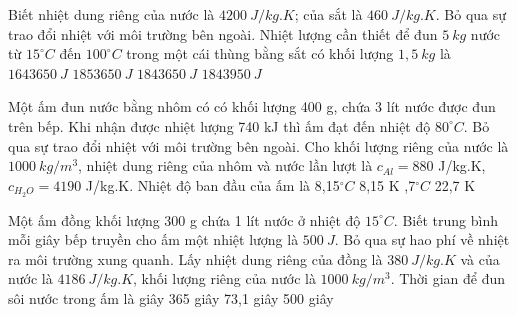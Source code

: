 \begin{vidu} 
	 Biết nhiệt dung riêng của nước là $4200 \ J / kg . K$; của sắt là $460 \ J / kg . K$. Bỏ qua sự trao đổi nhiệt với môi trường bên ngoài. Nhiệt lượng cần thiết để đun $5 \ kg$ nước từ $15^\circ C$ đến $100^\circ C$ trong một cái thùng bằng sắt có khối lượng $1,5 \ kg$ là
	\choice
	{$1643650 \ J$}
	{$1853650 \ J$}
	{\True $1843650 \ J$}
	{$1843950 \ J$}
\end{vidu}
\begin{vidu}%
	Một ấm đun nước bằng nhôm có có khối lượng 400 g, chứa 3 lít nước được đun trên bếp. Khi nhận được nhiệt lượng 740 kJ thì ấm đạt đến nhiệt độ $80^{\circ}C$.  Bỏ qua sự trao đổi nhiệt với môi trường bên ngoài. Cho khối lượng riêng của nước là $1000\ kg / m^3$, nhiệt dung riêng của nhôm và nước lần lượt là  $c_{Al}=880$ J/kg.K, $c_{H_2O}=4190$ J/kg.K. Nhiệt độ ban đầu của ấm là 
	\choice
	{8,15$^{\circ}C$}
	{8,15 K}
	{,7$^{\circ}C$}
	{22,7 K}
	\end{vidu}
\begin{vidu}
	Một ấm đồng khối lượng 300 g chứa 1 lít nước ở nhiệt độ $15^\circ C$. Biết trung bình mỗi giây bếp truyền cho ấm một nhiệt lượng là $500\ J$. Bỏ qua sự hao phí về nhiệt ra môi trường xung quanh. Lấy nhiệt dung riêng của đồng là $380 \ J /kg.K$ và của nước là $4186\ J /kg.K$, khối lượng riêng của nước là $1000\ kg / m^3$. Thời gian để đun sôi nước trong ấm là
	\choice
	{ giây}
	{365 giây}
	{73,1 giây}
	{500 giây}
\end{vidu}
